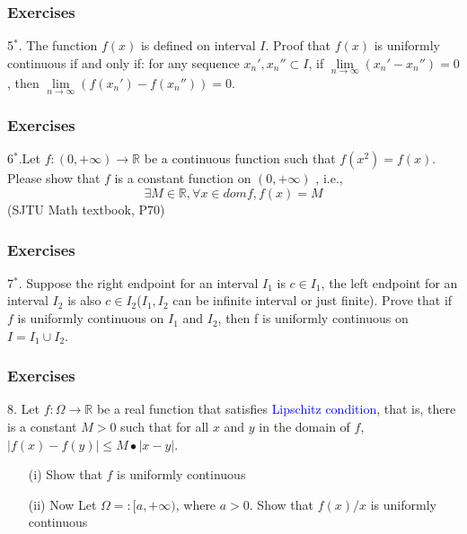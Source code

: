 \documentclass{beamer}
\begin{document}
\begin{frame}
    \frametitle{Exercises}
    5$^*$. The function $f(x)$ is defined on interval $I$. Proof that $f(x)$ is uniformly continuous
    if and only if: for any sequence ${x_n'},{x_n''}\subset I$, if $\underset{n \to \infty}{\lim}(x_n'-x_n'')=0$,
    then $\underset{n \to \infty}{\lim}(f(x_n')-f(x_n''))=0$.
\end{frame}
\begin{frame}
    \frametitle{Exercises}
    6$^*$.Let $f:(0,+\infty)\to\mathbb{R}$ be a continuous function such that 
    $f(x^2)=f(x)$. Please show that $f$ is a constant function on $(0,+\infty)$
    , i.e., $$\exists M \in \mathbb{R},  \forall x \in dom f, f(x)=M$$
    (SJTU Math textbook, P70)

\end{frame}
\begin{frame}
    \frametitle{Exercises}
    7$^*$. Suppose the right endpoint for an interval $I_1$ is $c\in I_1$, the left endpoint
    for an interval $I_2$ is also $c\in I_2$($I_1, I_2$ can be infinite interval or just finite). Prove that
    if $f$ is uniformly continuous on $I_1$ and $I_2$, then f is uniformly continuous on $I=I_1\cup I_2$.

\end{frame}
\begin{frame}
    \frametitle{Exercises}
    8. Let $f:\Omega \to \mathbb{R}$ be a real function that satisfies \textcolor{blue}{Lipschitz condition}, that is, 
    there is a constant $M>0$ such that for all $x$ and $y$ in the domain of $f$, $|f(x)-f(y)|\leq M∙|x-y|$.\\
    \vspace{1em}
    \begin{itemize}
        \item [(i)]Show that $f$ is uniformly continuous
        \item [(ii)] Now Let $\Omega=:[a, +\infty)$, where $a>0$. Show that $f(x)/x$ is uniformly continuous
    \end{itemize} 

\end{frame}
\end{document}

